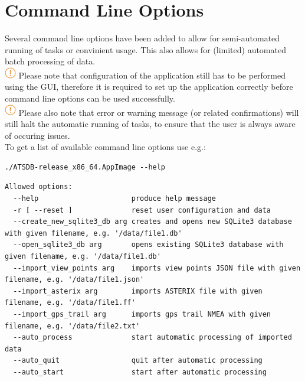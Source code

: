 \chapter{Command Line Options}
\label{sec:command_line} 

Several command line options have been added to allow for semi-automated running of tasks or convinient usage. This also allows for (limited) automated batch processing of data. \\

\includegraphics[width=0.5cm]{../../data/icons/hint.png} Please note that configuration of the application still has to be performed using the GUI, therefore it is required to set up the application correctly before command line options can be used successfully.\\

\includegraphics[width=0.5cm]{../../data/icons/hint.png} Please also note that error or warning message (or related confirmations) will still halt the automatic running of tasks, to ensure that the user is always aware of occuring issues. \\

To get a list of available command line options use e.g.:
\begin{lstlisting}
./ATSDB-release_x86_64.AppImage --help
\end{lstlisting}


\begin{lstlisting}
Allowed options:
  --help                      produce help message
  -r [ --reset ]              reset user configuration and data
  --create_new_sqlite3_db arg creates and opens new SQLite3 database with given filename, e.g. '/data/file1.db'
  --open_sqlite3_db arg       opens existing SQLite3 database with given filename, e.g. '/data/file1.db'
  --import_view_points arg    imports view points JSON file with given filename, e.g. '/data/file1.json'
  --import_asterix arg        imports ASTERIX file with given filename, e.g. '/data/file1.ff'
  --import_gps_trail arg      imports gps trail NMEA with given filename, e.g. '/data/file2.txt'
  --auto_process              start automatic processing of imported data
  --auto_quit                 quit after automatic processing
  --auto_start                start after automatic processing
\end{lstlisting}
\ \\


